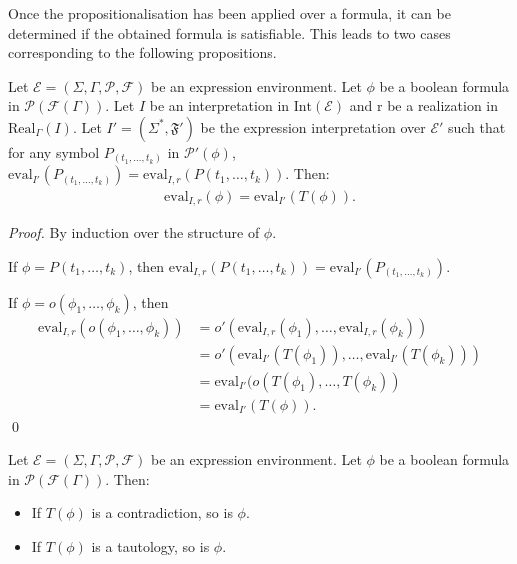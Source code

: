 \documentclass[a4paper]{llncs}
\begin{document}
  Once the propositionalisation has been applied over a formula, it can be determined if the obtained formula is satisfiable. This leads to two cases corresponding to the following propositions.
  
   \begin{proposition}\label{prop si tphi contra phi aussi}
    Let $\mathcal{E}=(\Sigma,\Gamma,\mathcal{P},\mathcal{F})$ be an expression environment. Let $\phi$ be a boolean formula in $\mathcal{P}(\mathcal{F}(\Gamma))$. Let $I$ be an interpretation in $\mathrm{Int}(\mathcal{E})$ and $\mathrm{r}$ be a realization in $\mathrm{Real}_\Gamma(I)$. Let $I'=(\Sigma^*,\mathfrak{F}')$ be the expression interpretation over $\mathcal{E}'$ such that for any symbol $P_{(t_1,\ldots,t_k)}$ in $\mathcal{P}'(\phi)$, $\mathrm{eval}_{I'}(P_{(t_1,\ldots,t_k)})=\mathrm{eval}_{I,r}(P(t_1,\ldots,t_k))$.
    Then:
        \begin{align*}
        \mathrm{eval}_{I,r}(\phi)=\mathrm{eval}_{I'}(T(\phi)).
        \end{align*}
  \end{proposition}
  \begin{proof}
    By induction over the structure of $\phi$.
    
    If $\phi=P(t_1,\ldots,t_k)$, then $\mathrm{eval}_{I,r}(P(t_1,\ldots,t_k))=\mathrm{eval}_{I'}(P_{(t_1,\ldots,t_k)})$.
    
    If $\phi=o(\phi_1,\ldots,\phi_k)$, then 
        \begin{align*}
        \mathrm{eval}_{I,r}(o(\phi_1,\ldots,\phi_k)) & = o'(\mathrm{eval}_{I,r}(\phi_1),\ldots,\mathrm{eval}_{I,r}(\phi_k))\\
      & = o'(\mathrm{eval}_{I'}(T(\phi_1)),\ldots,\mathrm{eval}_{I'}(T(\phi_k)))\\
      & = \mathrm{eval}_{I'}(o(T(\phi_1),\ldots,T(\phi_k))\\
      & = \mathrm{eval}_{I'}(T(\phi)).
        \end{align*}
    \qed
  \end{proof}
  
  \begin{corollary}\label{cor tphi contra phi aussi}
    Let $\mathcal{E}=(\Sigma,\Gamma,\mathcal{P},\mathcal{F})$ be an expression environment. Let $\phi$ be a boolean formula in $\mathcal{P}(\mathcal{F}(\Gamma))$. Then:
    \begin{itemize}
      \item If $T(\phi)$ is a contradiction, so is $\phi$.
      \item If $T(\phi)$ is a tautology, so is $\phi$.
    \end{itemize}
  \end{corollary}
  
\end{document}
